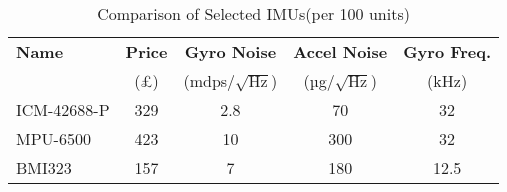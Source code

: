 \begin{table}[h]
  \centering
  \begin{tabular}{lcccc}
    \toprule
    \textbf{Name} & \textbf{Price} & \textbf{Gyro Noise} & \textbf{Accel Noise} & \textbf{Gyro Freq.} \\
    & (£) & (mdps/$\sqrt{\text{Hz}}$) & (µg/$\sqrt{\text{Hz}}$) & (kHz) \\
    \midrule
    ICM-42688-P\tablefootnote{\url{https://invensense.tdk.com/products/motion-tracking/6-axis/icm-42688-p/}} & 329 & 2.8 & 70 & 32 \\
    MPU-6500\tablefootnote{\url{https://invensense.tdk.com/products/motion-tracking/6-axis/mpu-6500/}}    & 423 & 10  & 300 & 32 \\
    BMI323\tablefootnote{\url{https://www.bosch-sensortec.com/products/motion-sensors/imus/bmi323}}      & 157 & 7   & 180 & 12.5 \\
    \bottomrule
  \end{tabular}
  \caption{Comparison of Selected IMUs(per 100 units)}
  \label{tab:imu-comparison}
\end{table}
